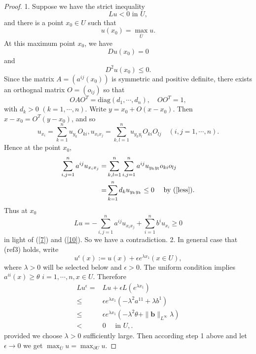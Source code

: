 \begin{proof}
 1. Suppose we have the strict inequality
  \[
  Lu<0 \text{ in }U,
  \] 
and there is a point $x_0\in U$ such that
\begin{equation}
  u(x_0)=\max_{\overline{U}}u.
\end{equation}
At this maximum point $x_0$, we have
\begin{equation}
  Du(x_0)=0\label{7}
\end{equation}
and
\begin{equation}
  D^2u(x_0)\le 0.\label{less}
\end{equation}
Since the matrix $A=\left( a^{ij}(x_0) \right) $ is symmetric and positive definite, there exists
an orthognal matrix $O=\left( o_{ij} \right) $ so that 
\begin{equation}
  OAO^{T}=\text{diag}\left( d_1,\cdots,d_n \right) , \quad O O^{T}=1,
\end{equation}
with $d_k>0$ $\left( k=1,\cdots,n \right) $. Write $y=x_0+O(x-x_0)$. Then $x-x_0=O^{T}(y-x_0)$, and so
\[
  u_{x_i}=\sum_{k=1}^{n} u_{y_k}O_{ki}, u_{x_ix_j}=\sum_{k,l=1}^{n}u_{y_ky_l}O_{ki}O_{lj}\quad \left( i,j=1,\cdots,n \right). 
\] 
Hence at the point $x_0$,
\begin{align}
  \sum_{i,j=1}^{n}a^{ij}u_{x_ix_j}=&\sum_{k,l=1}^{n} \sum_{i,j=1}^{n} a^{ij}u_{y_ky_l}o_{ki}o_{lj}\notag\\
  =& \sum_{k=1}^{n} d_ku_{y_ky_k}\le 0 \quad\text{ by (\ref{less})}\label{10}
.\end{align}
Thus at $x_0$
 \[
Lu=-\sum_{i,j=1}^{n} a^{ij}u_{x_ix_j}+\sum_{i=1}^{n} b^{i}u_{x_i}\ge 0
\] 
in light of (\ref{7}) and (\ref{10}). So we have a contradiction.
2. In general case that (ref{3}) holds, write
 \[
   u^{\epsilon}(x):=u(x)+\epsilon e^{\lambda x_1} (x\in  U),
\] 
where $\lambda>0$ will be selected below and $\epsilon>0$. The uniform condition implies $a^{ii}(x)\ge \theta$ $i=1,\cdots,n,x\in U$. Therefore
\begin{align*}
  Lu^{\epsilon }=&Lu+\epsilon L\left( e^{\lambda x_1} \right) \\
  \le & \epsilon e^{\lambda x_1}\left( -\lambda^2a^{11}+\lambda b^{1} \right) \\
  \le& \epsilon e^{\lambda x_1}\left( -\lambda^2\theta+\|\mathbf{b}\|_{L^{\infty}}\lambda \right)\\
  <&0\quad \text{ in }U,
.\end{align*}
provided we choose $\lambda>0$ sufficiently large. Then according step 1 above and let $\epsilon \to 0$ we get $\max_{\overline{U}}u=\max_{\partial U}u$.
\end{proof}
